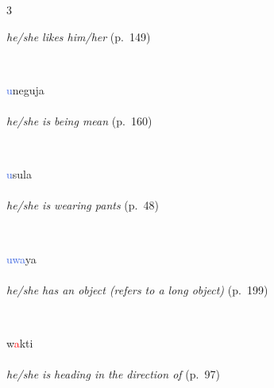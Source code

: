 \documentclass[oneside,openany]{book}%
\begin{document}
\begin{multicols}{3}
\begin{minipage}[t]{\linewidth}
\noindent \textit{he/she likes him/her} (p.~149)
\end{minipage}\\[1em]%
\begin{minipage}[t]{\linewidth}
\raggedright\noindent \textcolor{RoyalBlue}{u}neguja\\
\\
\noindent \textit{he/she is being mean} (p.~160)
\end{minipage}\\[1em]%
\begin{minipage}[t]{\linewidth}
\raggedright\noindent \textcolor{RoyalBlue}{u}sula\\
\\
\noindent \textit{he/she is wearing pants} (p.~48)
\end{minipage}\\[1em]%
\begin{minipage}[t]{\linewidth}
\raggedright\noindent \textcolor{RoyalBlue}{uwa}ya\\
\\
\noindent \textit{he/she has an object (refers to a long object)} (p.~199)
\end{minipage}\\[1em]%
\begin{minipage}[t]{\linewidth}
\raggedright\noindent w\textcolor{Red}{a}kti\\
\\
\noindent \textit{he/she is heading in the direction of} (p.~97)
\end{minipage}\\[1em]%
\end{multicols}%
\vspace{1em}%
\needspace{1.5in}%
\end{document}
